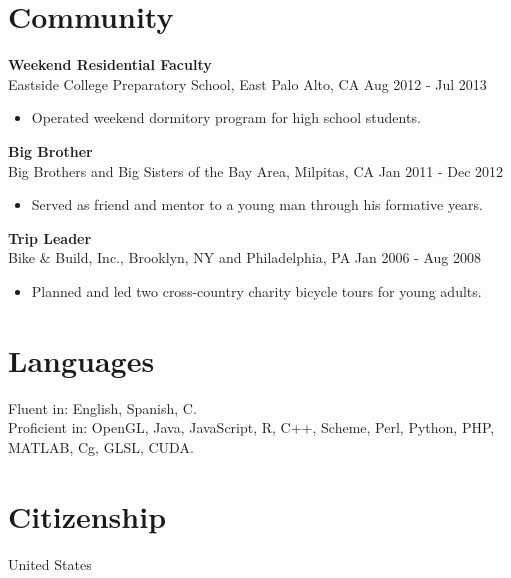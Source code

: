 \documentclass[line,margin]{res}
\begin{document}
\begin{resume}
\section{Community}
\textbf{Weekend Residential Faculty} \\
Eastside College Preparatory School, East Palo Alto, CA \hfill Aug 2012 - Jul 2013
\begin{itemize}  \itemsep -2pt %
\item Operated weekend dormitory program for high school students.
\end{itemize}

\textbf{Big Brother} \\
Big Brothers and Big Sisters of the Bay Area, Milpitas, CA \hfill Jan 2011 - Dec 2012
\begin{itemize}  \itemsep -2pt %
\item Served as friend and mentor to a young man through his formative years.
\end{itemize}

\textbf{Trip Leader} \\
Bike \& Build, Inc., Brooklyn, NY and Philadelphia, PA \hfill Jan 2006 - Aug 2008
\begin{itemize}  \itemsep -2pt %
\item Planned and led two cross-country charity bicycle tours for young adults.
\end{itemize}





\section{Languages}
Fluent in: English, Spanish, C.\\
Proficient in: OpenGL, Java, JavaScript, R, C++, Scheme, Perl, Python, PHP,\\
\mbox{MATLAB}, Cg, GLSL, CUDA.

\section{Citizenship}
United States

\end{resume}
\end{document}
